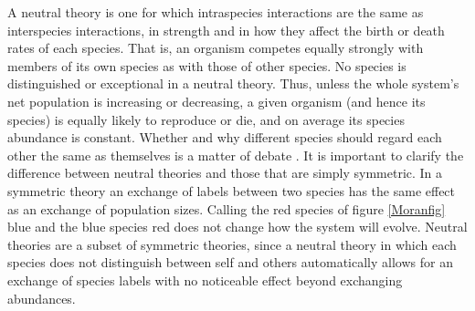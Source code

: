 A neutral theory is one for which intraspecies interactions are the same as interspecies interactions, in strength and in how they affect the birth or death rates of each species. 
That is, an organism competes equally strongly with members of its own species as with those of other species. 
No species is distinguished or exceptional in a neutral theory. 
Thus, unless the whole system's net population is increasing or decreasing, a given organism (and hence its species) is equally likely to reproduce or die, and on average its species abundance is constant. 
Whether and why different species should regard each other the same as themselves is a matter of debate \cite{Hubbell2001,Leibold2006,Leigh2007,Rosindell2011}. %
It is important to clarify the difference between neutral theories and those that are simply symmetric. 
In a symmetric theory an exchange of labels between two species has the same effect as an exchange of population sizes. 
Calling the red species of figure \ref{Moranfig} blue and the blue species red does not change how the system will evolve. 
Neutral theories are a subset of symmetric theories, since a neutral theory in which each species does not distinguish between self and others automatically allows for an exchange of species labels with no noticeable effect beyond exchanging abundances. 


